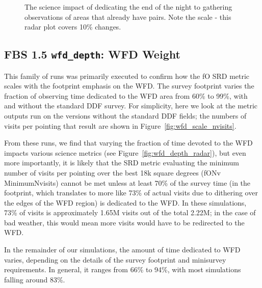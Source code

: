 \begin{figure}
\caption{The science impact of dedicating the end of the night to gathering observations of areas that already have pairs. Note the scale - this radar plot covers 10\% changes. }
\label{fig:third_radar}
\end{figure}



\subsection{FBS 1.5 {\tt wfd\_depth}: WFD Weight}\label{ss:wfd_depth}

This family of runs was primarily executed to confirm how the fO SRD metric scales with the footprint emphasis on the WFD. The survey footprint varies the fraction of observing time dedicated to the WFD area from 60\% to 99\%, with and without the standard DDF survey. For simplicity, here we look at the metric outputs run on the versions without the standard DDF fields; the numbers of visits per pointing that result are shown in Figure~\ref{fig:wfd_scale_nvisits}. 

From these runs, we find that varying the fraction of time devoted to the WFD impacts various science metrics (see Figure~\ref{fig:wfd_depth_radar}), but even more importantly, it is likely that the SRD metric evaluating the minimum number of visits per pointing over the best 18k square degrees (fONv MinimumNvisits) cannot be met unless at least 70\% of the survey time (in the footprint, which translates to more like 73\% of actual visits due to dithering over the edges of the WFD region) is dedicated to the WFD. In these simulations, 73\% of visits is approximately 1.65M visits out of the total 2.22M; in the case of bad weather, this would mean more visits would have to be redirected to the WFD. 

In the remainder of our simulations, the amount of time dedicated to WFD varies, depending on the details of the survey footprint and minisurvey requirements. In general, it ranges from 66\% to 94\%, with most simulations falling around 83\%. 

